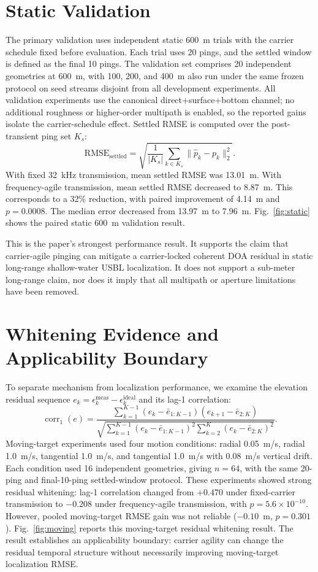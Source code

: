 \documentclass[journal]{IEEEtran}
\begin{document}
\section{Static Validation}
The primary validation uses independent static 600~m trials with the carrier schedule fixed
before evaluation. Each trial uses 20 pings, and the settled window is defined as the final 10
pings. The validation set comprises 20 independent geometries at 600~m, with 100, 200, and 400~m
also run under the same frozen protocol on seed streams disjoint from all development experiments.
All validation experiments use the canonical direct+surface+bottom channel; no additional
roughness or higher-order multipath is enabled, so the reported gains isolate the carrier-schedule
effect. Settled RMSE is computed over the post-transient ping set $K_s$:
\begin{equation}
\mathrm{RMSE}_{\mathrm{settled}}
=\sqrt{\frac{1}{|K_s|}\sum_{k\in K_s}\|\hat{p}_k-p_k\|_2^2}.
\end{equation}
With fixed 32~kHz transmission, mean settled RMSE was 13.01~m. With frequency-agile transmission,
mean settled RMSE decreased to 8.87~m. This corresponds to a 32\% reduction, with paired
improvement of 4.14~m and $p=0.0008$. The median error decreased from 13.97~m to 7.96~m.
Fig.~\ref{fig:static} shows the paired static 600~m validation result.

This is the paper's strongest performance result. It supports the claim that carrier-agile pinging
can mitigate a carrier-locked coherent DOA residual in static long-range shallow-water USBL
localization. It does not support a sub-meter long-range claim, nor does it imply that all
multipath or aperture limitations have been removed.

\section{Whitening Evidence and Applicability Boundary}
\label{sec:boundary}
To separate mechanism from localization performance, we examine the elevation residual sequence
$e_k=\epsilon^{\mathrm{meas}}_k-\epsilon^{\mathrm{ideal}}_k$ and its lag-1 correlation:
\begin{equation}
\operatorname{corr}_1(e)=
\frac{\sum_{k=1}^{K-1}(e_k-\bar{e}_{1:K-1})(e_{k+1}-\bar{e}_{2:K})}
{\sqrt{\sum_{k=1}^{K-1}(e_k-\bar{e}_{1:K-1})^2\sum_{k=2}^{K}(e_k-\bar{e}_{2:K})^2}}.
\end{equation}
Moving-target experiments used four motion conditions: radial 0.05~m/s, radial 1.0~m/s, tangential
1.0~m/s, and tangential 1.0~m/s with 0.08~m/s vertical drift. Each condition used 16 independent
geometries, giving $n=64$, with the same 20-ping and final-10-ping settled-window protocol. These
experiments showed strong residual whitening: lag-1 correlation changed from $+0.470$ under
fixed-carrier transmission to $-0.208$ under frequency-agile transmission, with $p=5.6\times
10^{-10}$. However, pooled moving-target RMSE gain was not reliable ($-0.10$~m, $p=0.301$).
Fig.~\ref{fig:moving} reports this moving-target residual whitening result. The result establishes
an applicability boundary: carrier agility can change the residual temporal structure without
necessarily improving moving-target localization RMSE.
\end{document}

